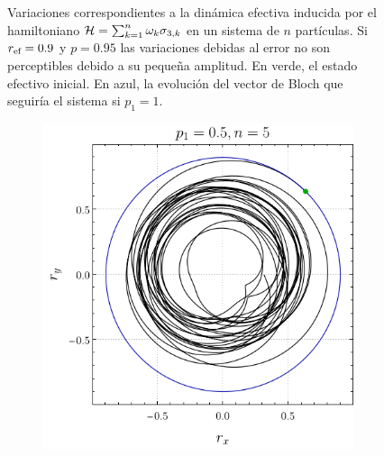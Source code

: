 \begin{figure}[ht!]
\begin{subfigure}{0.5\textwidth}
    \end{subfigure}
    \caption{Variaciones correspondientes a la dinámica efectiva inducida por el hamiltoniano $\mathcal{H}=\sum_{k=1}^{n}\omega_{k}\sigma_{3,k}$ en un sistema de $n$ partículas. Si $r_{\text{ef}}=0.9$ y $p=0.95$ las variaciones debidas al error no son perceptibles debido a su pequeña amplitud. En verde, el estado efectivo inicial. En azul, la evolución del vector de Bloch que seguiría el sistema si $p_{1}=1$. \label{fig:Oscilations12}}
\end{figure}
\begin{figure}[ht!]
    \centering
    \begin{subfigure}{0.5\textwidth}
      \centering
      \includegraphics[width=0.9\linewidth]{chapter3/figures_separable/local_all_ran_p=0.5_r=0.9_n=5_a=-3_b=3.png}
    \end{subfigure}%
    \begin{subfigure}{0.5\textwidth}
      \centering

\end{subfigure}
\end{figure}
